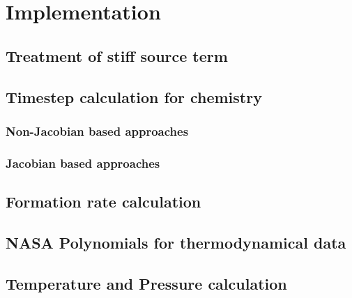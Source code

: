 \newpage
\chapter{Implementation}

\section{Treatment of stiff source term}

\section{Timestep calculation for chemistry}

\subsection{Non-Jacobian based approaches}
\subsection{Jacobian based approaches}

\section{Formation rate calculation}

\section{NASA Polynomials for thermodynamical data}

\section{Temperature and Pressure calculation}

